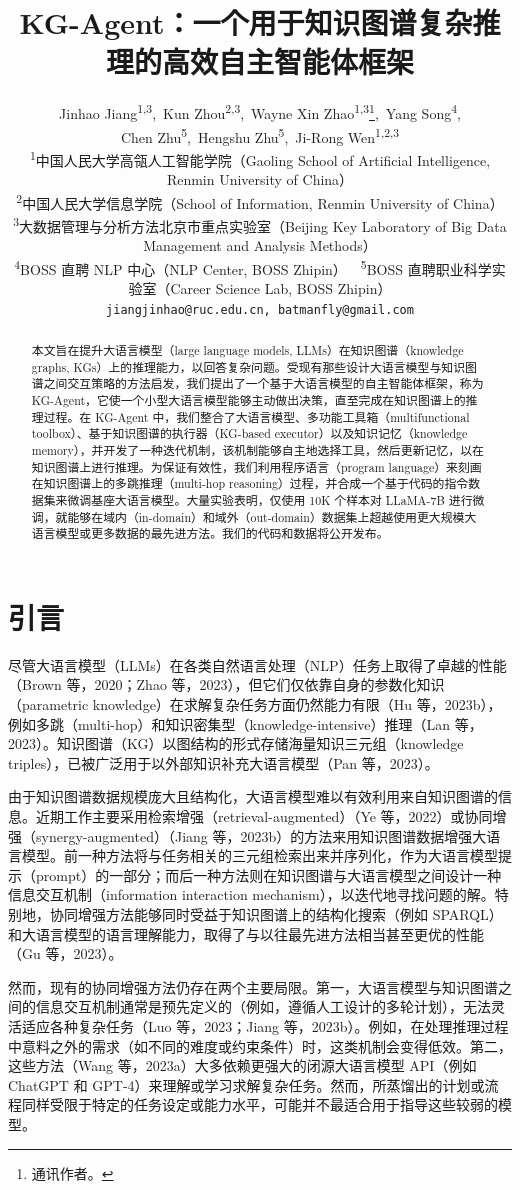 \documentclass[11pt,UTF8,fontset=fandol]{ctexart}
\title{\textbf{KG-Agent：一个用于知识图谱复杂推理的高效自主智能体框架}}
\author{Jinhao Jiang\textsuperscript{1,3},~Kun Zhou\textsuperscript{2,3},~Wayne Xin Zhao\textsuperscript{1,3}\thanks{通讯作者。},~Yang Song\textsuperscript{4}\footnotemark[1],\\
Chen Zhu\textsuperscript{5},~Hengshu Zhu\textsuperscript{5},~Ji-Rong Wen\textsuperscript{1,2,3}\\[0.4em]
\small \textsuperscript{1}中国人民大学高瓴人工智能学院（Gaoling School of Artificial Intelligence, Renmin University of China）\\
\small \textsuperscript{2}中国人民大学信息学院（School of Information, Renmin University of China）\\
\small \textsuperscript{3}大数据管理与分析方法北京市重点实验室（Beijing Key Laboratory of Big Data Management and Analysis Methods）\\
\small \textsuperscript{4}BOSS 直聘 NLP 中心（NLP Center, BOSS Zhipin）~~\textsuperscript{5}BOSS 直聘职业科学实验室（Career Science Lab, BOSS Zhipin）\\
\small \texttt{jiangjinhao@ruc.edu.cn, batmanfly@gmail.com}}
\date{}
\begin{document}
\maketitle

\begin{abstract}
本文旨在提升大语言模型（large language models, LLMs）在知识图谱（knowledge graphs, KGs）上的推理能力，以回答复杂问题。受现有那些设计大语言模型与知识图谱之间交互策略的方法启发，我们提出了一个基于大语言模型的自主智能体框架，称为 KG-Agent，它使一个小型大语言模型能够主动做出决策，直至完成在知识图谱上的推理过程。在 KG-Agent 中，我们整合了大语言模型、多功能工具箱（multifunctional toolbox）、基于知识图谱的执行器（KG-based executor）以及知识记忆（knowledge memory），并开发了一种迭代机制，该机制能够自主地选择工具，然后更新记忆，以在知识图谱上进行推理。为保证有效性，我们利用程序语言（program language）来刻画在知识图谱上的多跳推理（multi-hop reasoning）过程，并合成一个基于代码的指令数据集来微调基座大语言模型。大量实验表明，仅使用 10K 个样本对 LLaMA-7B 进行微调，就能够在域内（in-domain）和域外（out-domain）数据集上超越使用更大规模大语言模型或更多数据的最先进方法。我们的代码和数据将公开发布。
\end{abstract}

\section{引言}

尽管大语言模型（LLMs）在各类自然语言处理（NLP）任务上取得了卓越的性能（Brown 等，2020；Zhao 等，2023），但它们仅依靠自身的参数化知识（parametric knowledge）在求解复杂任务方面仍然能力有限（Hu 等，2023b），例如多跳（multi-hop）和知识密集型（knowledge-intensive）推理（Lan 等，2023）。知识图谱（KG）以图结构的形式存储海量知识三元组（knowledge triples），已被广泛用于以外部知识补充大语言模型（Pan 等，2023）。

由于知识图谱数据规模庞大且结构化，大语言模型难以有效利用来自知识图谱的信息。近期工作主要采用检索增强（retrieval-augmented）（Ye 等，2022）或协同增强（synergy-augmented）（Jiang 等，2023b）的方法来用知识图谱数据增强大语言模型。前一种方法将与任务相关的三元组检索出来并序列化，作为大语言模型提示（prompt）的一部分；而后一种方法则在知识图谱与大语言模型之间设计一种信息交互机制（information interaction mechanism），以迭代地寻找问题的解。特别地，协同增强方法能够同时受益于知识图谱上的结构化搜索（例如 SPARQL）和大语言模型的语言理解能力，取得了与以往最先进方法相当甚至更优的性能（Gu 等，2023）。

然而，现有的协同增强方法仍存在两个主要局限。第一，大语言模型与知识图谱之间的信息交互机制通常是预先定义的（例如，遵循人工设计的多轮计划），无法灵活适应各种复杂任务（Luo 等，2023；Jiang 等，2023b）。例如，在处理推理过程中意料之外的需求（如不同的难度或约束条件）时，这类机制会变得低效。第二，这些方法（Wang 等，2023a）大多依赖更强大的闭源大语言模型 API（例如 ChatGPT 和 GPT-4）来理解或学习求解复杂任务。然而，所蒸馏出的计划或流程同样受限于特定的任务设定或能力水平，可能并不最适合用于指导这些较弱的模型。
\end{document}
